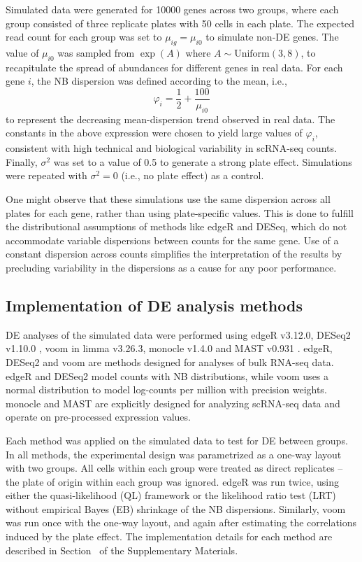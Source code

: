\documentclass[oupdraft]{bio}
\begin{document}
Simulated data were generated for 10000 genes across two groups, where each group consisted of three replicate plates with 50 cells in each plate.
The expected read count for each group was set to $\mu_{ig}=\mu_{i0}$ to simulate non-DE genes.
The value of $\mu_{i0}$ was sampled from $\exp(A)$ where $A \sim \mbox{Uniform}(3, 8)$, to recapitulate the spread of abundances for different genes in real data. 
For each gene $i$, the NB dispersion was defined according to the mean, i.e., 
\[
    \varphi_{i} = \frac{1}{2} + \frac{100}{\mu_{i0}} 
\]
to represent the decreasing mean-dispersion trend observed in real data.
The constants in the above expression were chosen to yield large values of $\varphi_{i}$, consistent with high technical and biological variability in scRNA-seq counts.
Finally, $\sigma^2$ was set to a value of 0.5 to generate a strong plate effect.
Simulations were repeated with $\sigma^2=0$ (i.e., no plate effect) as a control. 

One might observe that these simulations use the same dispersion across all plates for each gene, rather than using plate-specific values.
This is done to fulfill the distributional assumptions of methods like edgeR and DESeq, which do not accommodate variable dispersions between counts for the same gene.
Use of a constant dispersion across counts simplifies the interpretation of the results by precluding variability in the dispersions as a cause for any poor performance.

\subsection{Implementation of DE analysis methods}
DE analyses of the simulated data were performed using edgeR v3.12.0, DESeq2 v1.10.0 \citep{love2014moderated}, voom \citep{law2014voom} in limma v3.26.3, 
    monocle v1.4.0 and MAST v0.931 \citep{finak2015mast}.
edgeR, DESeq2 and voom are methods designed for analyses of bulk RNA-seq data.
edgeR and DESeq2 model counts with NB distributions, while voom uses a normal distribution to model log-counts per million with precision weights.
monocle and MAST are explicitly designed for analyzing scRNA-seq data and operate on pre-processed expression values.

Each method was applied on the simulated data to test for DE between groups. 
In all methods, the experimental design was parametrized as a one-way layout with two groups.
All cells within each group were treated as direct replicates -- the plate of origin within each group was ignored.
edgeR was run twice, using either the quasi-likelihood (QL) framework \citep{lund2012detecting} 
    or the likelihood ratio test (LRT) \citep{mccarthy2012differential} without empirical Bayes (EB) shrinkage of the NB dispersions.
Similarly, voom was run once with the one-way layout, and again after estimating the correlations induced by the plate effect.
The implementation details for each method are described in Section~\suppimplementation{} of the Supplementary Materials.
\end{document}
